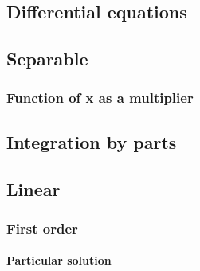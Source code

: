 \documentclass[12pt, a4paper]{article}
\begin{document}
    
    \maketitle

    \newpage

    \tableofcontents

    \newpage

    \begin{center}

    \section{Differential equations}

    \newpage

    \subsection{Separable}

    \subsubsection{Function of x as a multiplier}

    


    \subsection{Integration by parts}

    

    \newpage

    \subsection{Linear}

    \subsubsection{First order}

    \paragraph{Particular solution}
    
    
    
    \end{center}
    
\end{document}

